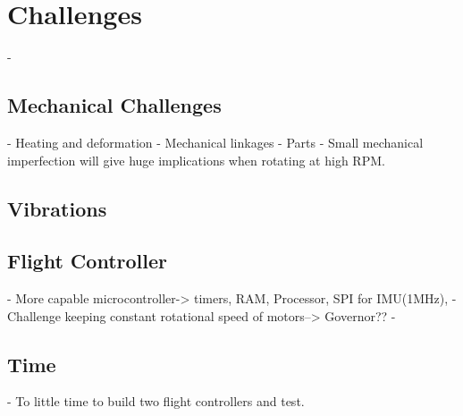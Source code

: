 \section{Challenges}
- 
\subsection{Mechanical Challenges}
- Heating and deformation
- Mechanical linkages 
- Parts
- Small mechanical imperfection will give huge implications when rotating at high RPM.

\subsection{Vibrations}
\subsection{Flight Controller}

- More capable microcontroller-> timers, RAM, Processor, SPI for IMU(1MHz), 
- Challenge keeping constant rotational speed of motors--> Governor??
- 

\subsection{Time}

- To little time to build two flight controllers and test.


